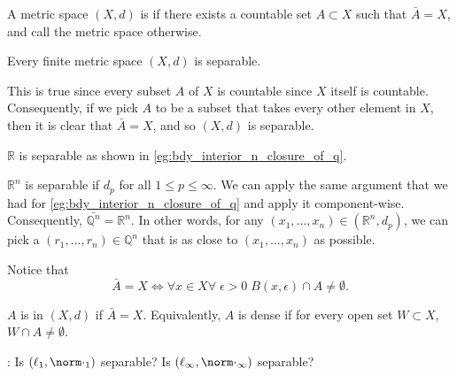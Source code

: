 \documentclass[notoc,notitlepage]{tufte-book}
\begin{document}
\begin{defn}[Separable]\label{defn:separable}
  A metric space $(X, d)$ is  if there exists a countable set $A \subset X$ such that $\bar{A} = X$, and call the metric space  otherwise.
\end{defn}

\begin{eg}
  Every finite metric space $(X, d)$ is separable.

  This is true since every subset $A$ of $X$ is countable since $X$ itself is countable. Consequently, if we pick $A$ to be a subset that takes every other element in $X$, then it is clear that $\bar{A} = X$, and so $(X, d)$ is separable.
\end{eg}

\begin{eg}
  $\mathbb{R}$ is separable as shown in \cref{eg:bdy_interior_n_closure_of_q}.
\end{eg}

\begin{eg}
  $\mathbb{R}^n$ is separable if $d_p$ for all $1 \leq p \leq \infty$. We can apply the same argument that we had for \cref{eg:bdy_interior_n_closure_of_q} and apply it component-wise. Consequently, $\bar{\mathbb{Q}^n} = \mathbb{R}^n$. In other words, for any $(x_1, \ldots, x_n) \in (\mathbb{R}^n, d_p)$, we can pick a $(r_1, \ldots, r_n) \in \mathbb{Q}^n$ that is as close to $(x_1, \ldots, x_n)$ as possible.
\end{eg}

\begin{remark}
  Notice that
  \begin{equation*}
    \bar{A} = X \iff \forall x \in X \forall \; \epsilon > 0 \; B(x, \epsilon) \cap A \neq \emptyset.
  \end{equation*}
\end{remark}

\begin{defn}[Dense]\label{defn:dense}
  $A$ is  in $(X, d)$ if $\bar{A} = X$. Equivalently, $A$ is dense if for every open set $W \subset X$, $W \cap A \neq \emptyset$.
\end{defn}

: Is $(\ell_1, \norm\cdot_1)$ separable? Is $(\ell_\infty, \norm\cdot_\infty)$ separable?
\end{document}
